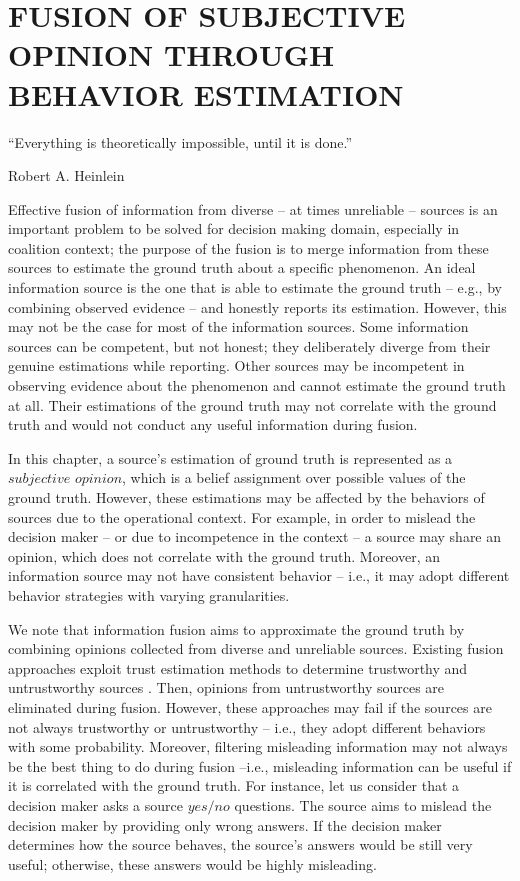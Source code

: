 \documentclass[a4,12pt]{ozu-thesis}
\begin{document}
\chapter{FUSION OF SUBJECTIVE OPINION THROUGH BEHAVIOR ESTIMATION}
\epigraph{``Everything is theoretically impossible, until it is done.''}{Robert A. Heinlein}

Effective fusion of information from diverse -- at times unreliable -- sources is an important problem to be solved for decision making domain, especially in coalition context; the purpose of  the fusion is to merge information from these sources to estimate the ground truth about a specific phenomenon. An ideal information source is the one that is able to estimate the ground truth -- e.g., by combining observed evidence -- and honestly reports its estimation. However, this may not be the case for most of the information sources. Some information sources can be competent, but not honest; they deliberately diverge from their genuine estimations while reporting. Other sources may be incompetent in observing evidence about the phenomenon and cannot estimate the ground truth at all. Their estimations of the ground truth may not correlate with the ground truth and would not conduct any useful  information during fusion.

 In this chapter, a source’s estimation of ground truth is represented as a $\mathit{subjective}$ $\mathit{opinion}$, which is a belief assignment over possible values of the ground truth. However, these estimations may be affected by the behaviors of sources due to the operational context. For example, in order to mislead the decision maker -- or due to incompetence in the context -- a source may share an opinion, which does not correlate with the ground truth. Moreover, an information source may not have consistent behavior -- i.e., it may adopt different behavior strategies with varying granularities.

  We note that information fusion aims to approximate the ground truth by combining opinions collected from diverse and unreliable sources. Existing fusion approaches exploit trust estimation methods to determine trustworthy and untrustworthy sources \cite{kaplan2014trust, etuk2013tidy}. Then, opinions from untrustworthy sources are eliminated during fusion. However, these approaches may fail if the sources are not always trustworthy or untrustworthy -- i.e., they adopt different behaviors with some probability. Moreover, filtering misleading information may not always be the best thing to do during fusion --i.e., misleading information can be useful if it is correlated with the ground truth. For instance, let us consider that a decision maker asks a source $\mathit{yes/no}$  questions. The source aims to mislead the decision maker by providing only wrong answers. If the decision maker determines how the source behaves, the source’s answers would be still very useful; otherwise, these answers would be highly misleading.
\end{document}
